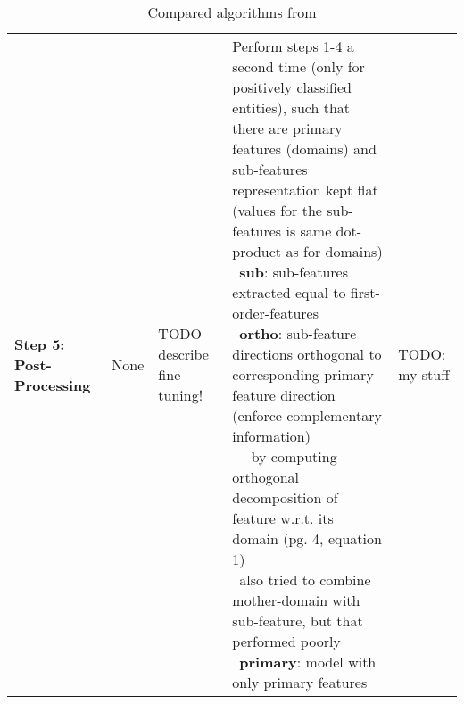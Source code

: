 \begin{landscape}
\begin{table}[]
{\begin{tabular}{lllll}
			\textbf{Step 5: Post-Processing} 
			&                   
			None 
			&                 
			TODO describe fine-tuning! 
			& 
			\specialcell[l]{
				Perform steps 1-4 a second time (only for positively classified entities), such that there are primary features (domains) and sub-features \\ representation kept flat (values for the sub-features is same dot-product as for domains) \\ \textbullet\, \textbf{sub}: sub-features extracted equal to first-order-features \\ \textbullet\, \textbf{ortho}: sub-feature directions orthogonal to corresponding primary feature direction (enforce complementary information) \\ ~~ by computing orthogonal decomposition of feature w.r.t. its domain (pg. 4, equation 1) \\ \textbullet\, also tried to combine mother-domain with sub-feature, but that performed poorly \\ \textbullet\, \textbf{primary}: model with only primary features}
			&
			TODO: my stuff
			\end{tabular}
		}
		\caption{Compared algorithms from \mainalgos}
		\label{tab:compared_algos}
	\end{table}
\end{landscape}


